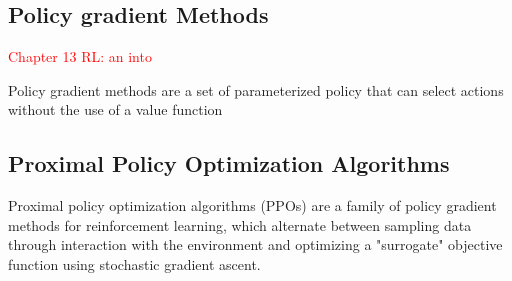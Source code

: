 \subsection{Policy gradient Methods}  
\textcolor{red}{Chapter 13 RL: an into}


Policy gradient methods are a set of parameterized policy that can select actions without the use of a value function


\subsection{Proximal Policy Optimization Algorithms}


Proximal policy optimization algorithms (PPOs) are a family of policy gradient methods for reinforcement learning, which alternate between sampling data through interaction with the environment and optimizing a "surrogate" objective function using stochastic gradient ascent.
